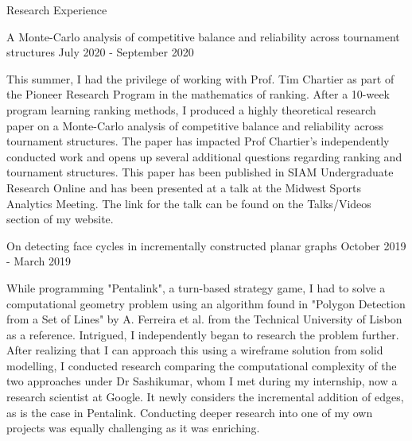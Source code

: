 \documentclass{resume} %
\begin{document}
\begin{rSection}{Research Experience}



\begin{rSubsection}{ A Monte-Carlo analysis of competitive balance and reliability across tournament structures }{ July 2020 - September 2020 }{}
\item This summer, I had the privilege of working with Prof. Tim Chartier as part of the Pioneer Research Program in the mathematics of ranking. After a 10-week program learning ranking methods, I produced a highly theoretical research paper on a Monte-Carlo analysis of competitive balance and reliability across tournament structures. The paper has impacted Prof Chartier's independently conducted work and opens up several additional questions regarding ranking and tournament structures. This paper has been published in SIAM Undergraduate Research Online and has been presented at a talk at the Midwest Sports Analytics Meeting. The link for the talk can be found on the Talks/Videos section of my website. 

\end{rSubsection}



\begin{rSubsection}{ On detecting face cycles in incrementally constructed planar graphs }{ October 2019 - March 2019 }{}
\item While programming "Pentalink", a turn-based strategy game, I had to solve a computational geometry problem using an algorithm found in "Polygon Detection from a Set of Lines" by A. Ferreira et al. from the Technical University of Lisbon as a reference. Intrigued, I independently began to research the problem further. After realizing that I can approach this using a wireframe solution from solid modelling, I conducted research comparing the computational complexity of the two approaches under Dr Sashikumar, whom I met during my internship, now a research scientist at Google. It newly considers the incremental addition of edges, as is the case in Pentalink. Conducting deeper research into one of my own projects was equally challenging as it was enriching. 

\end{rSubsection}


\end{rSection}
\end{document}
